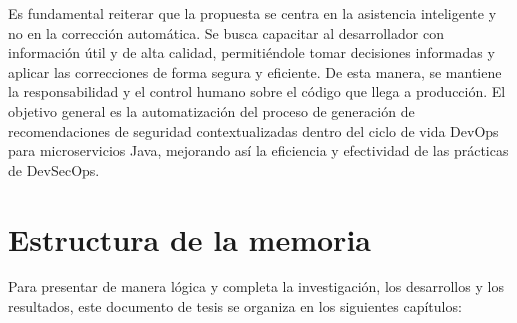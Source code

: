 Es fundamental reiterar que la propuesta se centra en la asistencia inteligente y no en la corrección automática. Se busca capacitar al desarrollador con información útil y de alta calidad, permitiéndole tomar decisiones informadas y aplicar las correcciones de forma segura y eficiente. De esta manera, se mantiene la responsabilidad y el control humano sobre el código que llega a producción. El objetivo general es la automatización del proceso de generación de recomendaciones de seguridad contextualizadas dentro del ciclo de vida DevOps para microservicios Java, mejorando así la eficiencia y efectividad de las prácticas de DevSecOps.

\section{Estructura de la memoria}\label{sec:estructura}
Para presentar de manera lógica y completa la investigación, los desarrollos y los resultados, este documento de tesis se organiza en los siguientes capítulos:

